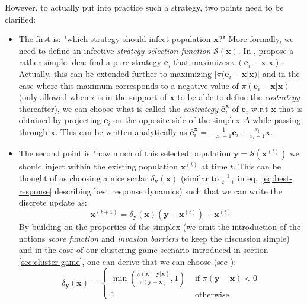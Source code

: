 \documentclass[11pt,a4paper]{article}
\begin{document}
However, to actually put into practice such a strategy, two points need to be clarified:
\begin{itemize}
    \item The first is: "which strategy should infect population $\mathbf{x}$?" More formally, we need to define an infective \textit{strategy selection function} $\mathcal{S}(\mathbf{x})$. In \cite{inimdyn}, propose a rather simple idea: find a pure strategy $\mathbf{e}_i$ that maximizes $\pi(\mathbf{e}_i-\mathbf{x}|\mathbf{x})$. Actually, this can be extended further to maximizing $|\pi(\mathbf{e}_i-\mathbf{x}|\mathbf{x})|$ and in the case where this maximum corresponds to a negative value of $\pi(\mathbf{e}_i-\mathbf{x}|\mathbf{x})$ (only allowed when $i$ is in the support of $\mathbf{x}$ to be able to define the \textit{costrategy} thereafter), we can choose what is called the \textit{costrategy} $\bar{\mathbf{e}}_i^\mathbf{x}$ of $\mathbf{e}_i$ w.r.t $\mathbf{x}$ that is obtained by projecting $\mathbf{e}_i$ on the opposite side of the simplex $\Delta$ while passing through $\mathbf{x}$. This can be written analytically as $\bar{\mathbf{e}}_i^\mathbf{x}=-\frac{1}{x_i-1}\mathbf{e}_i+\frac{x_i}{x_i-1}\mathbf{x}$.
    \item The second point is "how much of this selected population $\mathbf{y}=\mathcal{S}(\mathbf{x}^{(t)})$ we should inject within the existing population $\mathbf{x}^{(t)}$ at time $t$. This can be thought of as choosing a nice scalar $\delta_\mathbf{y}(\mathbf{x})$ (similar to $\frac{1}{t+1}$ in eq.~\ref{eq:best-response} describing best response dynamics) such that we can write the discrete update as:
    \begin{equation}
        \label{eq:inimdyn}
        \mathbf{x}^{(t+1)} = \delta_\mathbf{y}(\mathbf{x}) (\mathbf{y} - \mathbf{x}^{(t)}) + \mathbf{x}^{(t)}
    \end{equation}
    By building on the properties of the simplex (we omit the introduction of the notions \textit{score function} and \textit{invasion barriers} to keep the discussion simple) and in the case of our clustering game scenario introduced in section \ref{sec:cluster-game}, one can derive that we can choose (see \cite{bulo-thesis}):
    \begin{equation}
        \delta_\mathbf{y}(\mathbf{x}) = \begin{cases}
            \min\left(\frac{\pi(\mathbf{x}-\mathbf{y}|\mathbf{x})}{\pi(\mathbf{y}-\mathbf{x})}, 1\right) & \text{ if $\pi(\mathbf{y}-\mathbf{x}) < 0$} \\
            1 & \text{ otherwise}
        \end{cases}
    \end{equation}
\end{itemize}
\end{document}
